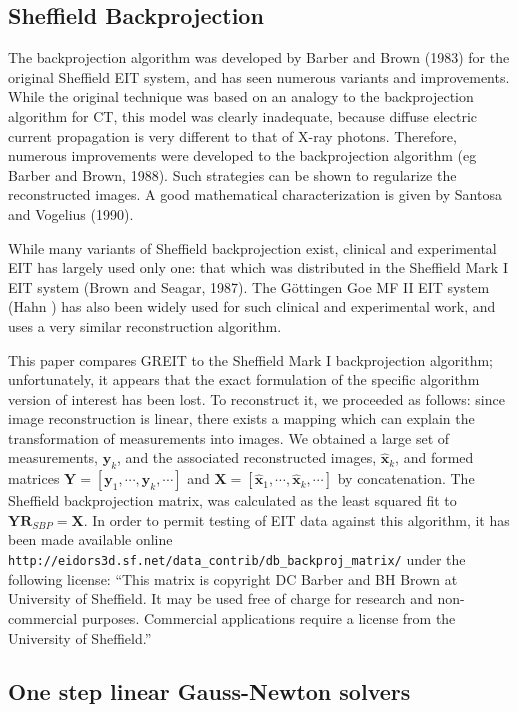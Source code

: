 \documentclass[12pt]{iopart}
\newcommand{\xH}{\mbox{$\mathbf{\hat x}$}}
\newcommand{\yB}{\mbox{$\mathbf{y}$}}
\newcommand{\RB}{\mbox{$\mathbf{R}$}}
\newcommand{\XB}{\mbox{$\mathbf{X}$}}
\newcommand{\YB}{\mbox{$\mathbf{Y}$}}
\begin{document}
\subsection{Sheffield Backprojection}

The backprojection algorithm was developed by 
Barber and Brown (1983) for the original 
Sheffield EIT system, and  has seen numerous 
variants and improvements. While the original
technique was based on an analogy to the backprojection
algorithm for CT, this model was clearly inadequate, because
diffuse electric current propagation is very different
to that of X-ray photons. Therefore, numerous improvements
were developed to the backprojection algorithm
(eg Barber and Brown, 1988). Such strategies
can be shown to regularize the reconstructed images.
A good mathematical characterization is given by
Santosa and Vogelius (1990).

While many variants of Sheffield backprojection exist,
clinical and experimental EIT has largely used only
one: that which was distributed in the
Sheffield Mark I EIT system (Brown and Seagar, 1987).
The G\"ottingen Goe MF II EIT system (Hahn )
has also been widely used for such clinical and
experimental work, and uses a very similar reconstruction
algorithm.

This paper compares GREIT to the Sheffield Mark I
backprojection algorithm;
unfortunately, it appears that the exact formulation
of the specific algorithm version of interest has been
lost. To reconstruct it, we proceeded as follows:
since image reconstruction is linear, there exists
a mapping which can explain the transformation of
measurements into images. We obtained a large set of
measurements, $\yB_k$, and the associated
reconstructed images, $\xH_k$, and formed matrices
$\YB = [ \yB_1, \cdots, \yB_k, \cdots]$ and 
$\XB = [ \xH_1, \cdots, \xH_k, \cdots]$ by concatenation.
The Sheffield backprojection matrix, was
calculated as the least squared fit to
   $\YB \RB_{SBP} = \XB$.
In order to permit testing of EIT data against
this algorithm, it has been made available
online 
\verb$http://eidors3d.sf.net/data_contrib/db_backproj_matrix/$
under the following license:
``This matrix is copyright DC Barber and BH Brown at
  University of Sheffield. It may be used free of charge
  for research and non-commercial purposes. Commercial
  applications require a license from the University of Sheffield.''


\subsection{One step linear Gauss-Newton solvers}
\label{subsec:OSLGNS}
\end{document}
